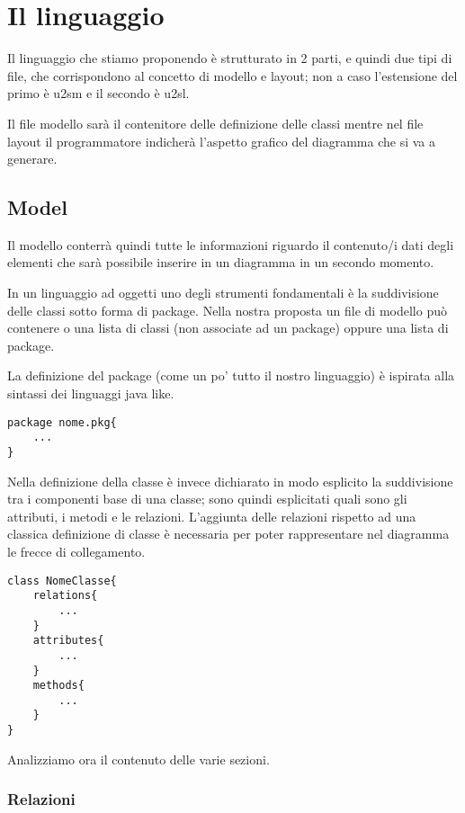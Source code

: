 \chapter{Il linguaggio}

Il linguaggio che stiamo proponendo è strutturato in 2 parti, e quindi due tipi di
file, che corrispondono al concetto di modello e layout; non a caso l'estensione
del primo è u2sm e il secondo è u2sl.

Il file modello sarà il contenitore delle definizione delle classi mentre nel
file layout il programmatore indicherà l'aspetto grafico del diagramma che si va
a generare.

\section{Model}

Il modello conterrà quindi tutte le informazioni riguardo il contenuto/i dati
degli elementi che sarà possibile inserire in un diagramma in un secondo
momento. 

In un linguaggio ad oggetti uno degli strumenti fondamentali è la suddivisione 
delle classi sotto forma di package. Nella nostra proposta un file di modello
può contenere o una lista di classi (non associate ad un package) oppure una
lista di package.

La definizione del package (come un po' tutto il nostro linguaggio) è 
ispirata alla sintassi dei linguaggi java like.

\begin{lstlisting}[caption={Dichiarazione di package}, style={model}]
package nome.pkg{
	...  	
}
\end{lstlisting}

Nella definizione della classe è invece dichiarato in modo esplicito la
suddivisione tra i componenti base di una classe; sono quindi esplicitati quali
sono gli attributi, i metodi e le relazioni. L'aggiunta delle relazioni rispetto
ad una classica definizione di classe è necessaria per poter rappresentare nel
diagramma le frecce di collegamento.


\begin{lstlisting}[caption={Dichiarazione di classe}, style={model}]
class NomeClasse{
	relations{
		...
	}
	attributes{
		...
	}
	methods{
		...
	}
}
\end{lstlisting}

Analizziamo ora il contenuto delle varie sezioni.

\subsection{Relazioni}

